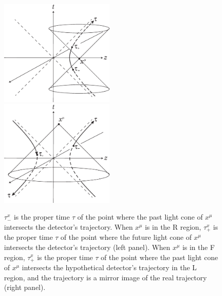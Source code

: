 \documentclass[aps,prd,preprintnumbers,nofootinbib,showpacs,11pt]{revtex4}%
\begin{document}
\begin{widetext}
\begin{figure}[t]
\begin{center}
    \includegraphics[width=5.5cm]{fig6a.eps}
~~~~~~~~~~~~~~~~~~~~~~
    \includegraphics[width=5.5cm]{fig6b.eps}
\caption{$\tau_-^x$ is the
proper time $\tau$ of the point where the past light cone of $x^\mu$ intersects 
the detector's trajectory. 
When $x^\mu$ is in the R region, $\tau_+^x$ is the proper time $\tau$ of the 
point where the future light cone of 
$x^\mu$ intersects the detector's trajectory (left panel). 
When $x^\mu$ is in the F region, $\tau_+^x$ is the proper time $\tau$ of the 
point where the past light cone of 
$x^\mu$ intersects the hypothetical detector's trajectory in the L region, and the trajectory is
a mirror image of the real trajectory (right panel). 
\label{fig:taupm}
}
\end{center}
\end{figure}


\end{widetext}
\end{document}
